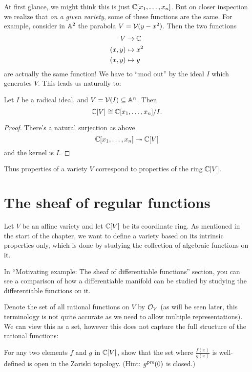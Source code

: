 At first glance, we might think this is just $\mathbb C[x_1, \dots, x_n]$.
But on closer inspection we realize that \emph{on a given variety},
some of these functions are the same.
For example, consider in $\mathbb A^2$ the parabola $V = \mathcal V(y-x^2)$.
Then the two functions
\begin{align*}
	V & \to \mathbb C \\
	(x,y) & \mapsto x^2 \\
	(x,y) & \mapsto y
\end{align*}
are actually the same function!
We have to ``mod out'' by the ideal $I$ which generates $V$.
This leads us naturally to:
\begin{theorem}
	Let $I$ be a radical ideal, and $V = \mathcal V(I) \subseteq \mathbb A^n$.
	Then \[ \mathbb C[V] \cong \mathbb C[x_1, \dots, x_n] / I.  \]
\end{theorem}
\begin{proof}
	There's a natural surjection as above
	\[ \mathbb C[x_1, \dots, x_n] \twoheadrightarrow \mathbb C[V] \]
	and the kernel is $I$.
\end{proof}
Thus properties of a variety $V$ correspond to properties of the ring $\mathbb C[V]$.

\section{The sheaf of regular functions}
\label{sec:sheaf_regular_functions}

Let $V$ be an affine variety and let $\mathbb C[V]$ be its coordinate ring.
As mentioned in the start of the chapter, we want to define a variety
based on its intrinsic properties only, which is done by studying the collection
of algebraic functions on it.

In \cite{ref:vakil} ``Motivating example: The sheaf of differentiable
functions'' section, you can see a comparison of how a differentiable manifold
can be studied by studying the differentiable functions on it.

Denote the set of all rational functions on $V$ by $\mathcal O_V$ (as will be seen
later, this terminology is not quite accurate as we need to allow multiple
representations). We can view this as a set, however this does not capture the
full structure of the rational functions:
\begin{ques}
	For any two elements $f$ and $g$ in $\mathbb C[V]$, show that the set where
	$\frac{f(x)}{g(x)}$ is well-defined is open in the Zariski topology.
	(Hint: $g^{\text{pre}}(0)$ is closed.)
\end{ques}

